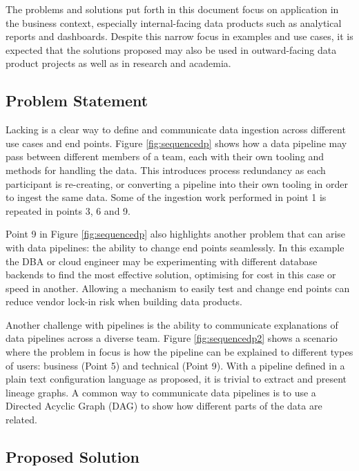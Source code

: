 The problems and solutions put forth in this document focus on
application in the business context, especially internal-facing data
products such as analytical reports and dashboards. Despite this narrow
focus in examples and use cases, it is expected that the solutions
proposed may also be used in outward-facing data product projects as
well as in research and academia.

\subsection{Problem Statement}\label{problem-statement}

Lacking is a clear way to define and communicate data ingestion across
different use cases and end points. Figure \ref{fig:sequencedp} shows
how a data pipeline may pass between different members of a team, each
with their own tooling and methods for handling the data. This
introduces process redundancy as each participant is re-creating, or
converting a pipeline into their own tooling in order to ingest the same
data. Some of the ingestion work performed in point 1 is repeated in
points 3, 6 and 9.



Point 9 in Figure \ref{fig:sequencedp} also highlights another problem
that can arise with data pipelines: the ability to change end points
seamlessly. In this example the DBA or cloud engineer may be
experimenting with different database backends to find the most
effective solution, optimising for cost in this case or speed in
another. Allowing a mechanism to easily test and change end points can
reduce vendor lock-in risk when building data products.



Another challenge with pipelines is the ability to communicate
explanations of data pipelines across a diverse team. Figure
\ref{fig:sequencedp2} shows a scenario where the problem in focus is how
the pipeline can be explained to different types of users: business
(Point 5) and technical (Point 9). With a pipeline defined in a plain
text configuration language as proposed, it is trivial to extract and
present lineage graphs. A common way to communicate data pipelines is to
use a Directed Acyclic Graph (DAG) to show how different parts of the
data are related.

\subsection{Proposed Solution}\label{proposed-solution}

